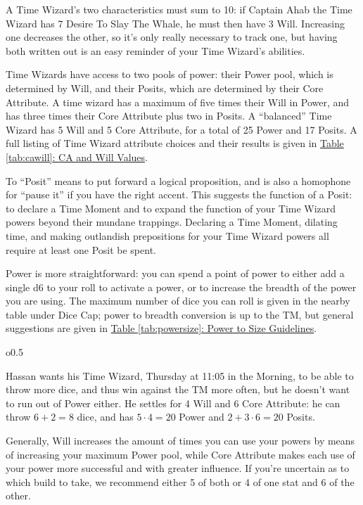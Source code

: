 \documentclass[twoside]{article}
\newenvironment{examplebox}[1]{\begin{tcolorbox}[colback=green!5!white,colframe=green!75!black,title={Example: #1}]}{\end{tcolorbox}\vspace{-30pt}}
\begin{document}
A Time Wizard's two characteristics must sum to 10: if Captain Ahab the Time Wizard has 7 Desire
To Slay The Whale, he must then have 3 Will. Increasing one decreases the other, so it's only
really necessary to track one, but having both written out is an easy reminder of your Time
Wizard's abilities.

Time Wizards have access to two pools of power: their Power pool, which is determined by Will,
and their Posits, which are determined by their Core Attribute. A time wizard has a maximum of
five times their Will in Power, and has three times their Core Attribute plus two in Posits.
A ``balanced'' Time Wizard has 5 Will and 5 Core Attribute, for a total of 25 Power and 17
Posits. A full listing of Time Wizard attribute choices and their results is given in
\hyperref[tab:cawill]{Table \ref*{tab:cawill}: CA and Will Values}.

To ``Posit'' means to put forward a logical proposition, and is also a homophone for ``pause
it'' if you have the right accent. This suggests the function of a Posit: to declare a Time
Moment and to expand the function of your Time Wizard powers beyond their mundane trappings.
Declaring a Time Moment, dilating time, and making outlandish prepositions for your Time Wizard
powers all require at least one Posit be spent.

Power is more straightforward: you can spend a point of power to either add a single d6 to your
roll to activate a power, or to increase the breadth of the power you are using. The maximum
number of dice you can roll is given in the nearby table under Dice Cap; power to breadth
conversion is up to the TM, but general suggestions are given in
\hyperref[tab:powersize]{Table \ref*{tab:powersize}: Power to Size Guidelines}.

\begin{wrapfigure}{o}{0.5\textwidth}
   \begin{examplebox}{Determining Characteristics}
      Hassan wants his Time Wizard, Thursday at 11:05 in the Morning, to be able to throw more
      dice, and thus win against the TM more often, but he doesn't want to run out of Power
      either. He settles for 4 Will and 6 Core Attribute: he can throw $6+2=8$ dice, and has
      $5\cdot 4=20$ Power and $2+3\cdot 6=20$ Posits.
   \end{examplebox}
\end{wrapfigure}

Generally, Will increases the amount of times you can use your powers by means of increasing
your maximum Power pool, while Core Attribute makes each use of your power more successful and
with greater influence. If you're uncertain as to which build to take, we recommend either 5
of both or 4 of one stat and 6 of the other.
\end{document}
